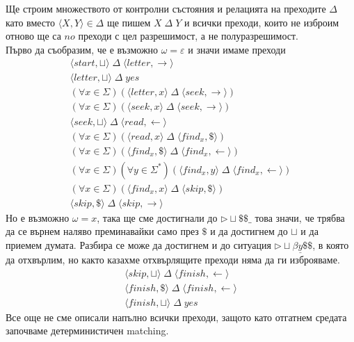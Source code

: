 \documentclass[14pt]{extarticle}
\begin{document}
Ще строим множеството от контролни състояния и релацията на преходите \(\Delta\) като вместо \(\langle X, Y \rangle \in \Delta\) ще пишем \(X \;\Delta\; Y\) и всички преходи, които не изброим отново ще са \(no\) преходи с цел разрешимост, а не полуразрешимост. \\

Първо да съобразим, че е възможно \(\omega = \varepsilon\) и значи имаме преходи
\begin{align*}
    \langle start, \sqcup \rangle \;\Delta\; \langle letter, \rightarrow \rangle \\
    \langle letter, \sqcup \rangle \;\Delta\; yes \\
    (\forall x \in \Sigma)(\langle letter, x \rangle \;\Delta\; \langle seek, \rightarrow \rangle) \\
    (\forall x \in \Sigma)(\langle seek, x \rangle \;\Delta\; \langle seek, \rightarrow \rangle) \\
    \langle seek, \sqcup \rangle \;\Delta\; \langle read, \leftarrow \rangle \\
    (\forall x \in \Sigma)(\langle read, x \rangle \;\Delta\; \langle find_x, \$\rangle) \\
    (\forall x \in \Sigma)(\langle find_x, \$ \rangle \;\Delta\; \langle find_x, \leftarrow \rangle) \\
    (\forall x \in \Sigma)(\forall y \in \Sigma^*)(\langle find_x, y \rangle \;\Delta\; \langle find_x, \leftarrow \rangle) \\
    (\forall x \in \Sigma)(\langle find_x, x \rangle \;\Delta\; \langle skip , \$ \rangle) \\
    \langle skip, \$ \rangle \;\Delta\; \langle skip, \rightarrow \rangle
\end{align*}
Но е възможно \(\omega = x\), така ще сме достигнали до \(\triangleright \sqcup \$\$\_\) това значи, че трябва да се върнем наляво преминавайки само през \(\$\) и да достигнем до \(\sqcup\) и да приемем думата. Разбира се може да достигнем и до ситуация \(\triangleright \sqcup \beta\underline{y}\$\$\), в която да отхвърлим, но както казахме отхвърлящите преходи няма да ги изброяваме.
\begin{align*}
    \langle skip, \sqcup \rangle \;\Delta\; \langle finish, \leftarrow \rangle \\
    \langle finish, \$ \rangle \;\Delta\; \langle finish, \leftarrow \rangle \\
    \langle finish, \sqcup \rangle \;\Delta\; yes
\end{align*}
Все още не сме описали напълно всички преходи, защото като отгатнем средата започваме детерминистичен matching.
\end{document}
